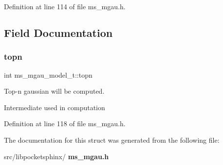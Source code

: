 Definition at line 114 of file ms\+\_\+mgau.\+h.



\subsection{Field Documentation}
\mbox{\label{structms__mgau__model__t_a0a67ef79bd74c55734b0944f0d61b668}} 
\subsubsection{topn}
{\footnotesize\ttfamily int ms\+\_\+mgau\+\_\+model\+\_\+t\+::topn}



Top-\/n gaussian will be computed. 

Intermediate used in computation 

Definition at line 118 of file ms\+\_\+mgau.\+h.



The documentation for this struct was generated from the following file\+:\begin{DoxyCompactItemize}
\item 
src/libpocketsphinx/\textbf{ ms\+\_\+mgau.\+h}\end{DoxyCompactItemize}
